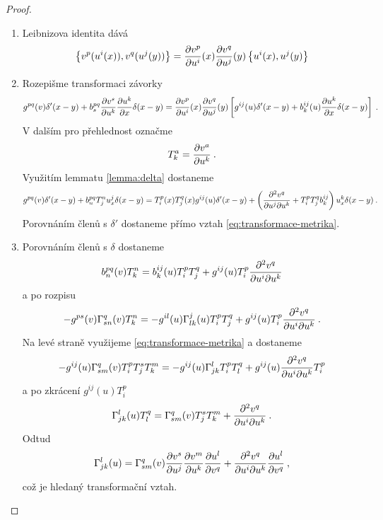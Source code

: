 \begin{proof}
    \begin{enumerate}
        \item Leibnizova identita dává
        \begin{align}
            \left \lbrace v^p(u^i(x)),v^q(u^j(y)) \right \rbrace = \frac{\partial v^p}{\partial u^i}(x) \frac{\partial v^q}{\partial u^j}(y) \left \lbrace u^i(x),u^j(y) \right \rbrace
        \end{align}
        \item Rozepišme transformaci závorky
        \begin{align}
            g^{pq}(v) \delta'(x-y) + b^{pq}_s \frac{\partial v^s}{\partial u^k} \frac{\partial u^k}{\partial x} \delta(x-y)
            = \frac{\partial v^p}{\partial u^i}(x) \frac{\partial v^q}{\partial u^j}(y) \left[ g^{ij}(u) \delta'(x-y) + b^{ij}_k(u) \frac{\partial u^k}{\partial x} \delta(x-y) \right] \:.
        \end{align}
        V dalším pro přehlednost označme
        \begin{align}
            T^a_k = \frac{\partial v^a}{\partial u^k} \:.
        \end{align}
        Využitím lemmatu \vref{lemma:delta} dostaneme
        \begin{align}
            g^{pq}(v) \delta'(x-y) + b^{pq}_n T^n_j u^j_x \delta(x-y) 
            = T^p_i(x) T^q_j(x) g^{ij}(u) \delta'(x-y) 
            + \left( \frac{\partial^2 v^q}{\partial u^j \partial u^k} + T^p_i T^q_j b^{ij}_k \right) u^k_x \delta(x-y) \:.
        \end{align}
        Porovnáním členů s $\delta'$ dostaneme přímo vztah \eqref{eq:transformace-metrika}.
        \item Porovnáním členů s $\delta$ dostaneme
        \begin{align}
            b^{pq}_n(v) T^n_k =
            b^{ij}_k(u) T^p_i T^q_j + g^{ij}(u) T^p_i \frac{\partial^2 v^q}{\partial u^i \partial u^k}
        \end{align}
        a po rozpisu
        \begin{align}
            - g^{ps}(v) \Gamma^{q}_{sn}(v) T^n_k =
            - g^{il}(u) \Gamma^j_{lk}(u) T^p_i T^q_j + g^{ij}(u) T^p_i \frac{\partial^2 v^q}{\partial u^i \partial u^k} \:.
        \end{align}
        Na levé straně využijeme \eqref{eq:transformace-metrika} a dostaneme
        \begin{align}
            -g^{ij}(u) \Gamma^q_{sm}(v) T^p_i T^s_j T^m_k = - g^{ij}(u) \Gamma^l_{jk} T^p_i T^q_l + g^{ij}(u) \frac{\partial^2 v^q}{\partial u^i \partial u^k} T^p_i 
        \end{align}
        a po zkrácení $g^{ij}(u) T^p_i$
        \begin{align}
            \Gamma^l_{jk}(u) T^q_l = \Gamma^q_{sm}(v) T^s_j T^m_k + \frac{\partial^2 v^q}{\partial u^i \partial u^k} \:.
        \end{align}
        Odtud
        \begin{align}
            \Gamma^l_{jk}(u) = \Gamma^q_{sm}(v) \frac{\partial v^s}{\partial u^j} \frac{\partial v^m}{\partial u^k} \frac{\partial u^l}{\partial v^q} + \frac{\partial^2 v^q}{\partial u^i \partial u^k} \frac{\partial u^l}{\partial v^q} \:,
        \end{align}
        což je hledaný transformační vztah.
    \end{enumerate}
\end{proof}

